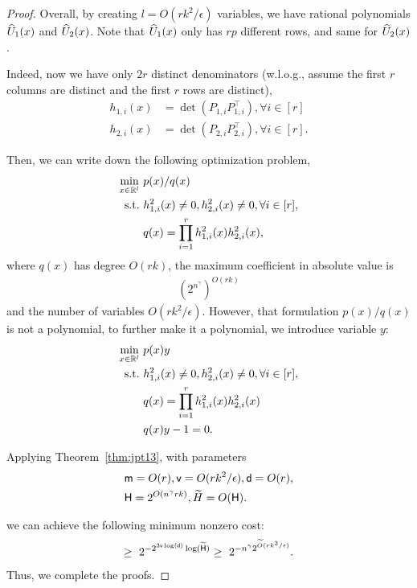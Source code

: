 \begin{proof}
Overall, by creating $l = O(rk^2/\epsilon)$ variables, we have rational polynomials $\widehat{U}_1(x)$ and $\widehat{U}_2(x)$. Note that $\widehat{U}_1(x)$ only has $rp$ different rows, and same for $\widehat{U}_2(x)$.

 Indeed, now we have only $2 r$ distinct denominators (w.l.o.g., assume the first $r$ columns are distinct and the first $r$ rows are distinct),
\begin{align*}
h_{1,i}(x) & = \det ( P_{1,i} P_{1,i}^\top ), \forall i \in[r] \\
h_{2,i}(x) & = \det ( P_{2,i} P_{2,i}^\top ), \forall i \in[r].
\end{align*}



Then, we can write down the following optimization problem,
\begin{align*}
\min _{x \in \mathbb{R}^l} & ~ p(x) / q(x) \\
\mathrm{s.t. } & ~ h_{1,i}^2(x) \neq 0, h_{2,i}^2(x) \neq 0, \forall i \in[r], \\
& ~ q(x)=\prod_{i=1}^r h_{1,i}^2(x) h_{2,i}^2(x),
\end{align*}
where $q(x)$ has degree $O(r k)$, the maximum coefficient in absolute value is 
\begin{align*}
( 2^{n^{\gamma}} )^ {O (r k )}
\end{align*}
 and the number of variables $O (r k^2 / \epsilon )$. However, that formulation $p(x)/q(x)$ is not a polynomial, to further make it a polynomial, we introduce variable $y$:
 \begin{align*}
\min _{x \in \mathbb{R}^l} & ~ p(x) y \\
\mathrm{s.t. } & ~ h_{1,i}^2(x) \neq 0, h_{2,i}^2(x) \neq 0, \forall i \in[r], \\
& ~ q(x)=\prod_{i=1}^r h_{1,i}^2(x) h_{2,i}^2(x) \\
& ~ q(x)y - 1 =0.
\end{align*}

Applying Theorem~\ref{thm:jpt13}, with parameters
\begin{align*}
& \mathsf{m}= O(r), \mathsf{v} = O(rk^2/\epsilon),  \mathsf{d} = O(r) , \\
& \mathsf{H} = 2^{O( n^{\gamma} rk ) } ,  \widetilde{H} = O(\mathsf{H}) .
\end{align*}

we can achieve the following minimum nonzero cost: 
\begin{align*}
\geq  ~ 2^{-2^{3 \mathsf{v} \log (\mathsf{d})} \log( \widetilde{\mathsf{H}}) } 
\geq  ~ 
2^{-n^\gamma 2^{\widetilde{O} (r k^2 / \epsilon )}  } .
\end{align*}
 Thus, we complete the proofs.
\end{proof}